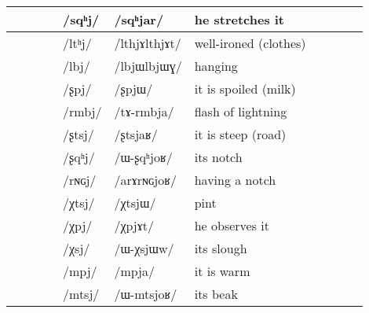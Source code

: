 \documentclass[oldfontcommands,oneside,a4paper,11pt]{article}
\newcommand{\ipa}[1]{\mbox{/#1/}} %
\newcommand{\trois}[1]{/#1/}
\newcommand{\tib}[1]{\cellcolor{lightgray}\textbf{#1}}
\newcommand{\idph}[1]{\cellcolor{gray}\textbf{#1}}
\begin{document}
\begin{landscape}
\begin{longtable}{l|lll|lll|lll|l}
 		& 		&		&		&\trois{sqʰj} 		&\ipa{sqʰjar} 		& he stretches it\\
\midrule										
 		& 		&		&		&\trois{ltʰj}  \idph{}		&\ipa{lthjɤlthjɤt} 		&well-ironed (clothes)\\
 		& 		&		&		&\trois{lbj} \idph{}		&\ipa{lbjɯlbjɯɣ} 		&hanging\\
\midrule												
 		& 		&		&		&\trois{ʂpj} 		&\ipa{ʂpjɯ} 		&it is spoiled (milk)\\
 		& 		&		&		&\trois{rmbj} 		&\ipa{tɤ-rmbja} 		&flash of lightning\\
 		& 		&		&		&\trois{ʂtsj} 		&\ipa{ʂtsjaʁ} 		&it is steep (road)\\
 		& 		&		&		&\trois{ʂqʰj} 		&\ipa{ɯ-ʂqʰjoʁ} 		&its notch\\
 		& 		&		&		&\trois{rɴɢj} 		&\ipa{arɤrɴɢjoʁ} 		&having a notch\\
\midrule												
 		& 		&		&		&\trois{χtsj} 		&\ipa{χtsjɯ} 		&pint\\
 		& 		&		&		&\trois{χpj} \tib{}		&\ipa{χpjɤt} 		&he  observes it\\
 		& 		&		&		&\trois{χsj} 		&\ipa{ɯ-χsjɯw} 		&its slough \\
\midrule												
 		& 		&		&		&\trois{mpj} 		&\ipa{mpja} 		&it is warm\\
 		& 		&		&		&\trois{mtsj} 		&\ipa{ɯ-mtsjoʁ} 		&its beak\\
\end{longtable}
 
 

 
  

\end{landscape}
\end{document}
